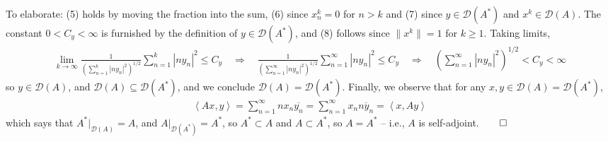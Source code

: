 \documentclass[10pt]{article}
\newcommand{\1}[1]{\mathbbm{1}_{#1}} \newcommand{\mc}[1]{\mathcal{#1}}
\newcommand{\ip}[2]{\left\langle#1,#2\right\rangle }
\begin{document}
    To elaborate: (5) holds by moving the fraction into the sum, (6) since $x^k_n=0$ for $n>k$ and (7) since $y\in\mc{D}(A^\ast)$ and $x^k\in\mc{D}(A)$. The constant $0<C_y<\infty$ is furnished by the definition of $y\in\mc{D}(A^\ast)$, and (8)
    follows since $\|x^k\|=1$ for $k\geq 1$. Taking limits,
    \begin{align*}
        \lim_{k\rightarrow\infty}\frac{1}{\left(\sum_{n=1}^k|ny_n|^2\right)^{1/2}}\sum_{n=1}^k|ny_n|^2\leq C_y\quad\Rightarrow\quad\frac{1}{\left(\sum_{n=1}^\infty|ny_n|^2\right)^{1/2}}\sum_{n=1}^\infty|ny_n|^2\leq C_y\quad\Rightarrow\quad \left(\sum_{n=1}^\infty|ny_n|^2\right)^{1/2}<C_y<\infty
    \end{align*}
    so $y\in\mc{D}(A)$, and $\mc{D}(A)\subseteq\mc{D}(A^\ast)$, and we conclude $\mc{D}(A)=\mc{D}(A^\ast)$. Finally, we observe that for any $x,y\in\mc{D}(A)=\mc{D}(A^\ast)$,
    \begin{align*}
        \ip{Ax}{y}=\sum_{n=1}^\infty nx_n\overline{y_n}=\sum_{n=1}^\infty x_n\overline{ny_n}=\ip{x}{Ay}
    \end{align*}
    which says that $A^\ast\big|_{\mc{D}(A)}=A$, and $A\big|_{\mc{D}(A^\ast)}=A^\ast$, so $A^\ast\subset A$ and $A\subset A^\ast$, so $A=A^\ast$ -- i.e., $A$ is self-adjoint.\hfill{$\qed$}
    
\end{document}
